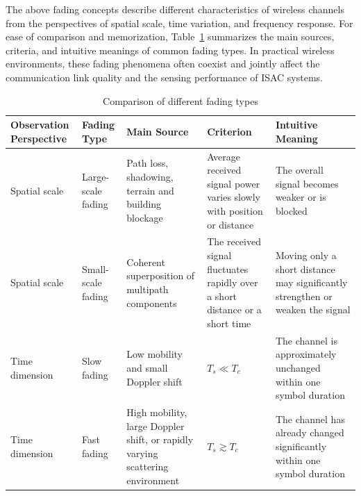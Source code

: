 The above fading concepts describe different characteristics of wireless channels
from the perspectives of spatial scale,
time variation,
and frequency response.
For ease of comparison and memorization,
Table~\ref{tab:fading-types-comparison} summarizes the main sources,
criteria,
and intuitive meanings of common fading types.
In practical wireless environments,
these fading phenomena often coexist
and jointly affect the communication link quality and the sensing performance of ISAC systems.
\begin{table}[htbp]
    \centering
    \caption{Comparison of different fading types}
    \label{tab:fading-types-comparison}
    \renewcommand{\arraystretch}{1.35}
    \begin{tabularx}{\textwidth}{p{} p{} X X X}
        \hline
        \textbf{Observation Perspective}
        &
        \textbf{Fading Type}
        &
        \textbf{Main Source}
        &
        \textbf{Criterion}
        &
        \textbf{Intuitive Meaning}
        \\
        \hline

        Spatial scale
        &
        Large-scale fading
        &
        Path loss, shadowing, terrain and building blockage
        &
        Average received signal power varies slowly with position or distance
        &
        The overall signal becomes weaker or is blocked
        \\

        Spatial scale
        &
        Small-scale fading
        &
        Coherent superposition of multipath components
        &
        The received signal fluctuates rapidly over a short distance or a short time
        &
        Moving only a short distance may significantly strengthen or weaken the signal
        \\

        Time dimension
        &
        Slow fading
        &
        Low mobility and small Doppler shift
        &
        \(T_s \ll T_c\)
        &
        The channel is approximately unchanged within one symbol duration
        \\

        Time dimension
        &
        Fast fading
        &
        High mobility, large Doppler shift, or rapidly varying scattering environment
        &
        \(T_s \gtrsim T_c\)
        &
        The channel has already changed significantly within one symbol duration
        \\


\end{tabularx}
\end{table}
